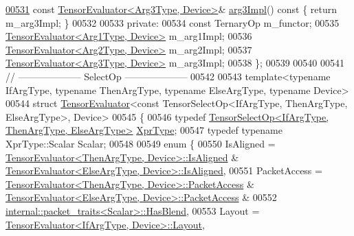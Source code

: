 \begin{DoxyCode}
\hyperlink{struct_eigen_1_1_tensor_evaluator_3_01const_01_tensor_cwise_ternary_op_3_01_ternary_op_00_01_arg9fef65261bbea39b0e5e8b56a6f07cfb_ab99cdf4bb3e47617ee3595792aa62ac4}{00531}   \textcolor{keyword}{const} \hyperlink{struct_eigen_1_1_tensor_evaluator}{TensorEvaluator<Arg3Type, Device>}& 
      \hyperlink{struct_eigen_1_1_tensor_evaluator_3_01const_01_tensor_cwise_ternary_op_3_01_ternary_op_00_01_arg9fef65261bbea39b0e5e8b56a6f07cfb_ab99cdf4bb3e47617ee3595792aa62ac4}{arg3Impl}()\textcolor{keyword}{ const }\{ \textcolor{keywordflow}{return} m\_arg3Impl; \}
00532 
00533  \textcolor{keyword}{private}:
00534   \textcolor{keyword}{const} TernaryOp m\_functor;
00535   \hyperlink{struct_eigen_1_1_tensor_evaluator}{TensorEvaluator<Arg1Type, Device>} m\_arg1Impl;
00536   \hyperlink{struct_eigen_1_1_tensor_evaluator}{TensorEvaluator<Arg2Type, Device>} m\_arg2Impl;
00537   \hyperlink{struct_eigen_1_1_tensor_evaluator}{TensorEvaluator<Arg3Type, Device>} m\_arg3Impl;
00538 \};
00539 
00540 
00541 \textcolor{comment}{// -------------------- SelectOp --------------------}
00542 
00543 \textcolor{keyword}{template}<\textcolor{keyword}{typename} IfArgType, \textcolor{keyword}{typename} ThenArgType, \textcolor{keyword}{typename} ElseArgType, \textcolor{keyword}{typename} Device>
00544 \textcolor{keyword}{struct }\hyperlink{struct_eigen_1_1_tensor_evaluator}{TensorEvaluator}<const TensorSelectOp<IfArgType, ThenArgType, ElseArgType>, Device>
00545 \{
00546   \textcolor{keyword}{typedef} \hyperlink{class_eigen_1_1_tensor_select_op}{TensorSelectOp<IfArgType, ThenArgType, ElseArgType>}
       \hyperlink{class_eigen_1_1_tensor_cwise_ternary_op}{XprType};
00547   \textcolor{keyword}{typedef} \textcolor{keyword}{typename} XprType::Scalar Scalar;
00548 
00549   \textcolor{keyword}{enum} \{
00550     IsAligned = \hyperlink{struct_eigen_1_1_tensor_evaluator}{TensorEvaluator<ThenArgType, Device>::IsAligned}
       & \hyperlink{struct_eigen_1_1_tensor_evaluator}{TensorEvaluator<ElseArgType, Device>::IsAligned},
00551     PacketAccess = \hyperlink{struct_eigen_1_1_tensor_evaluator}{TensorEvaluator<ThenArgType, Device>::PacketAccess}
       & \hyperlink{struct_eigen_1_1_tensor_evaluator}{TensorEvaluator<ElseArgType, Device>::PacketAccess} &
00552                    \hyperlink{struct_eigen_1_1internal_1_1packet__traits}{internal::packet\_traits<Scalar>::HasBlend},
00553     Layout = \hyperlink{struct_eigen_1_1_tensor_evaluator}{TensorEvaluator<IfArgType, Device>::Layout},

\end{DoxyCode}
